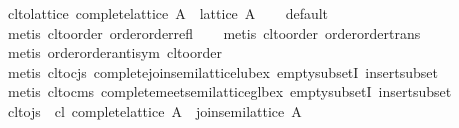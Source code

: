 \begin{isabellebody}
\isanewline
{}\isamarkupfalse%
\ cl{}to{}lattice{}\ {}complete{}lattice\ A\ {}\ lattice\ A{}\isanewline
%
\isadelimproof
\ \ %
\endisadelimproof
%
\isatagproof
{}\isamarkupfalse%
\ default\isanewline
\ \ \isamarkupfalse%
\ {}metis\ cl{}to{}order\ order{}order{}refl{}\isanewline
\ \ \isamarkupfalse%
\ {}metis\ cl{}to{}order\ order{}order{}trans{}\isanewline
\ \ \isamarkupfalse%
\ {}metis\ order{}order{}antisym\ cl{}to{}order{}\isanewline
\ \ \isamarkupfalse%
\ {}metis\ cl{}to{}cjs\ complete{}join{}semilattice{}lub{}ex\ empty{}subsetI\ insert{}subset{}\isanewline
\ \ \isamarkupfalse%
\ {}metis\ cl{}to{}cms\ complete{}meet{}semilattice{}glb{}ex\ empty{}subsetI\ insert{}subset{}%
\endisatagproof
{\isafoldproof}%
%
\isadelimproof
\isanewline
%
\endisadelimproof
\isanewline
{}\isamarkupfalse%
\ cl{}to{}js{}\ \ cl{}\ {}complete{}lattice\ A{}\ \ {}join{}semilattice\ A{}\isanewline

\end{isabellebody}
